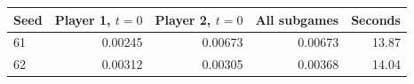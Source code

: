 \begin{tabular}{lrrrr}
\toprule
Seed & Player 1, $t=0$ & Player 2, $t=0$ & All subgames & Seconds \\
\midrule
61 & 0.00245 & 0.00673 & 0.00673 & 13.87 \\
62 & 0.00312 & 0.00305 & 0.00368 & 14.04 \\
\bottomrule
\end{tabular}
